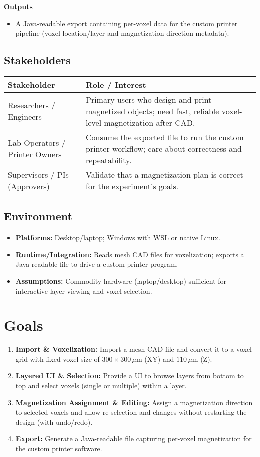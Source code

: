 \documentclass{article}
\begin{document}
\noindent\textbf{Outputs }
\begin{itemize}
  \item A Java-readable export containing per-voxel data for the custom printer pipeline (voxel location/layer and magnetization direction metadata).
\end{itemize}


\subsection{Stakeholders}

\begin{tabularx}{\textwidth}{lX}
\toprule
\textbf{Stakeholder} & \textbf{Role / Interest}\\
\midrule
Researchers / Engineers & Primary users who design and print magnetized objects; need fast, reliable voxel-level magnetization after CAD.\\
Lab Operators / Printer Owners & Consume the exported file to run the custom printer workflow; care about correctness and repeatability.\\
Supervisors / PIs (Approvers) & Validate that a magnetization plan is correct for the experiment’s goals.\\
\bottomrule
\end{tabularx}
\subsection{Environment}
\begin{itemize}
  \item \textbf{Platforms:} Desktop/laptop; Windows with WSL or native Linux.
  \item \textbf{Runtime/Integration:} Reads mesh CAD files for voxelization; exports a Java-readable file to drive a custom printer program.
  \item \textbf{Assumptions:} Commodity hardware (laptop/desktop) sufficient for interactive layer viewing and voxel selection.
\end{itemize}



\section{Goals}
\begin{enumerate}
  \item \textbf{Import \& Voxelization:} Import a mesh CAD file and convert it to a voxel grid with fixed voxel size of $300 \times 300\,\mu\text{m}$ (XY) and $110\,\mu\text{m}$ (Z).
  \item \textbf{Layered UI \& Selection:} Provide a UI to browse layers from bottom to top and select voxels (single or multiple) within a layer.
  \item \textbf{Magnetization Assignment \& Editing:} Assign a magnetization direction to selected voxels and allow re-selection and changes without restarting the design (with undo/redo).
  \item \textbf{Export:} Generate a Java-readable file capturing per-voxel magnetization for the custom printer software.
\end{enumerate}
\end{document}
